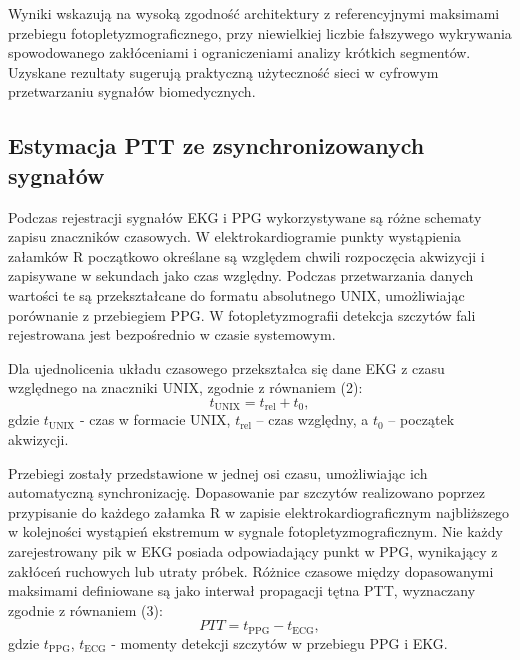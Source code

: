 \documentclass[journal]{IEEEtran}
\begin{document}
{\newpage
Wyniki wskazują na wysoką zgodność architektury z referencyjnymi maksimami przebiegu fotopletyzmograficznego, przy niewielkiej liczbie fałszywego wykrywania spowodowanego zakłóceniami i ograniczeniami analizy krótkich segmentów. Uzyskane rezultaty sugerują praktyczną użyteczność sieci w cyfrowym przetwarzaniu sygnałów biomedycznych.


\subsection{Estymacja PTT ze zsynchronizowanych sygnałów}
Podczas rejestracji sygnałów EKG i PPG wykorzystywane są różne schematy zapisu znaczników czasowych. W elektrokardiogramie punkty wystąpienia załamków R początkowo określane są względem chwili rozpoczęcia akwizycji i zapisywane w sekundach jako czas względny. Podczas przetwarzania danych wartości te są przekształcane do formatu absolutnego UNIX, umożliwiając porównanie z przebiegiem PPG. W fotopletyzmografii detekcja szczytów fali rejestrowana jest bezpośrednio w czasie systemowym.

Dla ujednolicenia układu czasowego przekształca się dane EKG z czasu względnego na znaczniki UNIX, zgodnie z równaniem (2):
\begin{equation}
t_{\mathrm{UNIX}} = t_{\mathrm{rel}} + t_{0},
\end{equation}
gdzie $t_{\mathrm{UNIX}}$ - czas w formacie UNIX, $t_{\mathrm{rel}}$ – czas względny, a $t_{0}$ – początek akwizycji.

Przebiegi zostały przedstawione w jednej osi czasu, umożliwiając ich automatyczną synchronizację. Dopasowanie par szczytów realizowano poprzez przypisanie do każdego załamka R w zapisie elektrokardiograficznym najbliższego w kolejności wystąpień ekstremum w sygnale fotopletyzmograficznym. Nie każdy zarejestrowany pik w EKG posiada odpowiadający punkt w PPG, wynikający z zakłóceń ruchowych lub utraty próbek. Różnice czasowe między dopasowanymi maksimami definiowane są jako interwał propagacji tętna PTT, wyznaczany zgodnie z równaniem (3):
\begin{equation}
PTT = t_{\mathrm{PPG}} - t_{\mathrm{ECG}},
\end{equation}
gdzie $t_{\mathrm{PPG}}$, $t_{\mathrm{ECG}}$ - momenty detekcji szczytów w przebiegu PPG i EKG. 

}
\end{document}
